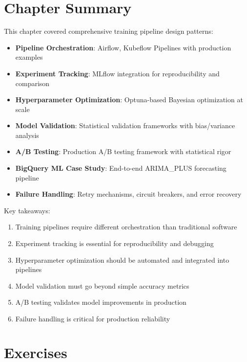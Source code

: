 \section{Chapter Summary}

This chapter covered comprehensive training pipeline design patterns:

\begin{itemize}
    \item \textbf{Pipeline Orchestration}: Airflow, Kubeflow Pipelines with production examples
    \item \textbf{Experiment Tracking}: MLflow integration for reproducibility and comparison
    \item \textbf{Hyperparameter Optimization}: Optuna-based Bayesian optimization at scale
    \item \textbf{Model Validation}: Statistical validation frameworks with bias/variance analysis
    \item \textbf{A/B Testing}: Production A/B testing framework with statistical rigor
    \item \textbf{BigQuery ML Case Study}: End-to-end ARIMA\_PLUS forecasting pipeline
    \item \textbf{Failure Handling}: Retry mechanisms, circuit breakers, and error recovery
\end{itemize}

Key takeaways:
\begin{enumerate}
    \item Training pipelines require different orchestration than traditional software
    \item Experiment tracking is essential for reproducibility and debugging
    \item Hyperparameter optimization should be automated and integrated into pipelines
    \item Model validation must go beyond simple accuracy metrics
    \item A/B testing validates model improvements in production
    \item Failure handling is critical for production reliability
\end{enumerate}

\section{Exercises}

